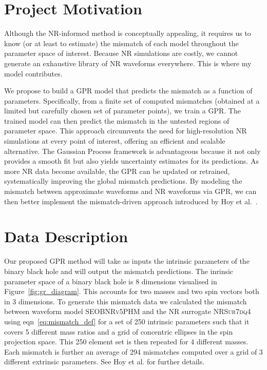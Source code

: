 \documentclass{ucdgradtaughtthesis}
\begin{document}
\section{Project Motivation}
Although the NR-informed method is conceptually appealing, it requires us to know (or at least to estimate) 
the mismatch of each model throughout the parameter space of interest. Because
NR simulations are costly, we cannot generate an exhaustive library of NR waveforms
everywhere. This is where my model contributes.
%
%

We propose to build a GPR model that predicts the mismatch as a function of parameters. Specifically, from a finite set of computed mismatches (obtained at a limited but carefully chosen set of parameter points), we train a GPR.
The trained model can then predict the mismatch in the untested regions of parameter space. This approach circumvents the need for high-resolution NR simulations at every point of interest,
offering an efficient and scalable alternative. The Gaussian Process framework is advantageous because it not only provides a smooth fit but also yields uncertainty estimates for its predictions.
As more NR data become available, the GPR can be updated or retrained, systematically improving the global mismatch predictions.
By modeling the mismatch between approximate waveforms and NR waveforms via GPR, we can then better implement the mismatch-driven approach introduced by Hoy et al.~\cite{Ogpaper}. 

\section{Data Description}
\label{sec:data_description}
Our proposed GPR method will take as inputs the intrinsic parameters of the binary black hole and will output the mismatch predictions.
The inrinsic parameter space of a binary black hole is 8 dimensions visualised in Figure~\ref{fig:gr_diagram}. This accounts for two masses and two spin vectors both in 3 dimensions. 
To generate this mismatch data we calculated the mismatch between waveform model \textsc{SEOBNRv5PHM} \cite{bestNRfitS} and the NR surrogate \textsc{NRSur7dq4} \cite{NRsurrogate} using eqn~\eqref{eq:mismatch_def} for a set of 250 intrinsic parameters 
such that it covers 5 different mass ratios and a grid of concentric ellipses in the spin projection space.
This 250 element set is then repeated for 4 different masses.
Each mismatch is further an average of 294 mismatches computed over a grid of 3 different extrinsic parameters.
See Hoy et al. for further details.
%
\end{document}
